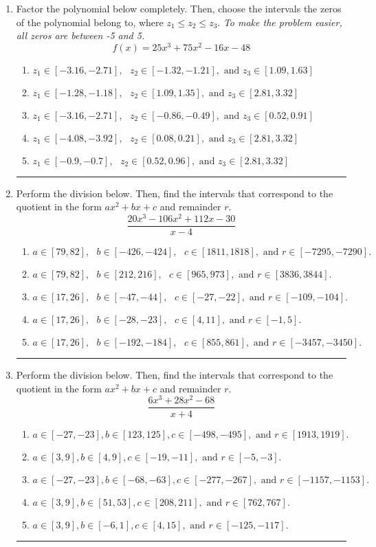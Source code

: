 \documentclass[14pt]{extbook}
\newcommand{\litem}[1]{\item#1\hspace*{-1cm}\rule{\textwidth}{0.4pt}}
\begin{document}
\begin{enumerate}
\litem{
Factor the polynomial below completely. Then, choose the intervals the zeros of the polynomial belong to, where $z_1 \leq z_2 \leq z_3$. \textit{To make the problem easier, all zeros are between -5 and 5.}\[ f(x) = 25x^{3} +75 x^{2} -16 x -48 \]\begin{enumerate}[label=\Alph*.]
\item \( z_1 \in [-3.16, -2.71], \text{   }  z_2 \in [-1.32, -1.21], \text{   and   } z_3 \in [1.09, 1.63] \)
\item \( z_1 \in [-1.28, -1.18], \text{   }  z_2 \in [1.09, 1.35], \text{   and   } z_3 \in [2.81, 3.32] \)
\item \( z_1 \in [-3.16, -2.71], \text{   }  z_2 \in [-0.86, -0.49], \text{   and   } z_3 \in [0.52, 0.91] \)
\item \( z_1 \in [-4.08, -3.92], \text{   }  z_2 \in [0.08, 0.21], \text{   and   } z_3 \in [2.81, 3.32] \)
\item \( z_1 \in [-0.9, -0.7], \text{   }  z_2 \in [0.52, 0.96], \text{   and   } z_3 \in [2.81, 3.32] \)

\end{enumerate} }
\litem{
Perform the division below. Then, find the intervals that correspond to the quotient in the form $ax^2+bx+c$ and remainder $r$.\[ \frac{20x^{3} -106 x^{2} +112 x -30}{x -4} \]\begin{enumerate}[label=\Alph*.]
\item \( a \in [79, 82], \text{   } b \in [-426, -424], \text{   } c \in [1811, 1818], \text{   and   } r \in [-7295, -7290]. \)
\item \( a \in [79, 82], \text{   } b \in [212, 216], \text{   } c \in [965, 973], \text{   and   } r \in [3836, 3844]. \)
\item \( a \in [17, 26], \text{   } b \in [-47, -44], \text{   } c \in [-27, -22], \text{   and   } r \in [-109, -104]. \)
\item \( a \in [17, 26], \text{   } b \in [-28, -23], \text{   } c \in [4, 11], \text{   and   } r \in [-1, 5]. \)
\item \( a \in [17, 26], \text{   } b \in [-192, -184], \text{   } c \in [855, 861], \text{   and   } r \in [-3457, -3450]. \)

\end{enumerate} }
\litem{
Perform the division below. Then, find the intervals that correspond to the quotient in the form $ax^2+bx+c$ and remainder $r$.\[ \frac{6x^{3} +28 x^{2} -68}{x + 4} \]\begin{enumerate}[label=\Alph*.]
\item \( a \in [-27, -23], b \in [123, 125], c \in [-498, -495], \text{ and } r \in [1913, 1919]. \)
\item \( a \in [3, 9], b \in [4, 9], c \in [-19, -11], \text{ and } r \in [-5, -3]. \)
\item \( a \in [-27, -23], b \in [-68, -63], c \in [-277, -267], \text{ and } r \in [-1157, -1153]. \)
\item \( a \in [3, 9], b \in [51, 53], c \in [208, 211], \text{ and } r \in [762, 767]. \)
\item \( a \in [3, 9], b \in [-6, 1], c \in [4, 15], \text{ and } r \in [-125, -117]. \)


\end{enumerate}}
\end{enumerate}
\end{document}
